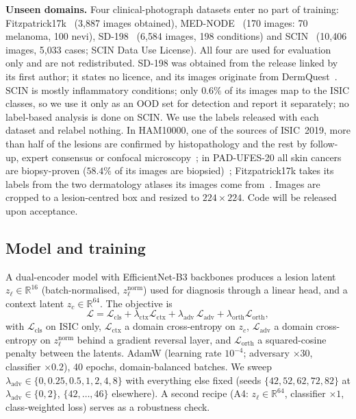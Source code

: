 \documentclass{midl}
\newcommand{\lam}{\lambda_{\mathrm{adv}}}
\begin{document}
\textbf{Unseen domains.} Four clinical-photograph datasets enter no part of training:
Fitzpatrick17k~\cite{groh2021} (3{,}887 images obtained), MED-NODE~\cite{giotis2015mednode}
(170 images: 70 melanoma, 100 nevi), SD-198~\cite{sun2016sd198} (6{,}584 images, 198 conditions)
and SCIN~\cite{ward2024scin} (10{,}406 images, 5{,}033 cases; SCIN Data Use License). All four
are used for evaluation only and are not redistributed. SD-198 was obtained from the release
linked by its first author; it states no licence, and its images originate from
DermQuest~\cite{sun2016sd198}.
SCIN is mostly inflammatory conditions; only $0.6\%$ of its images map to the ISIC classes,
so we use it only as an OOD set for detection and report it separately; no label-based
analysis is done on SCIN. We use the labels released with each dataset and relabel nothing. In HAM10000,
one of the sources of ISIC~2019, more than half of the lesions are confirmed by histopathology and the rest by
follow-up, expert consensus or confocal microscopy~\cite{tschandl2018}; in PAD-UFES-20 all skin cancers are
biopsy-proven ($58.4\%$ of its images are biopsied)~\cite{pacheco2020}; Fitzpatrick17k takes its labels from the two
dermatology atlases its images come from~\cite{groh2021}. Images are cropped to a lesion-centred box and resized to
$224\times224$. Code will be released upon acceptance.

\subsection{Model and training}

A dual-encoder model with EfficientNet-B3 backbones produces a lesion latent
$z_\ell\in\mathbb{R}^{16}$ (batch-normalised, $z_\ell^{\mathrm{norm}}$) used for diagnosis
through a linear head, and a context latent $z_c\in\mathbb{R}^{64}$. The objective is
\begin{equation}
\mathcal{L}=\mathcal{L}_{\mathrm{cls}}+\lambda_{\mathrm{ctx}}\mathcal{L}_{\mathrm{ctx}}
+\lam\,\mathcal{L}_{\mathrm{adv}}+\lambda_{\mathrm{orth}}\mathcal{L}_{\mathrm{orth}},
\end{equation}
with $\mathcal{L}_{\mathrm{cls}}$ on ISIC only, $\mathcal{L}_{\mathrm{ctx}}$ a domain
cross-entropy on $z_c$, $\mathcal{L}_{\mathrm{adv}}$ a domain cross-entropy on
$z_\ell^{\mathrm{norm}}$ behind a gradient reversal layer, and $\mathcal{L}_{\mathrm{orth}}$
a squared-cosine penalty between the latents. AdamW (learning rate $10^{-4}$; adversary
$\times30$, classifier $\times0.2$), 40 epochs, domain-balanced batches. We sweep
$\lam\in\{0,0.25,0.5,1,2,4,8\}$ with everything else fixed (seeds $\{42,52,62,72,82\}$ at $\lam\in\{0,2\}$,
$\{42,\ldots,46\}$ elsewhere). A second recipe (A4: $z_\ell\in\mathbb{R}^{64}$, classifier
$\times1$, class-weighted loss) serves as a robustness check.
\end{document}
